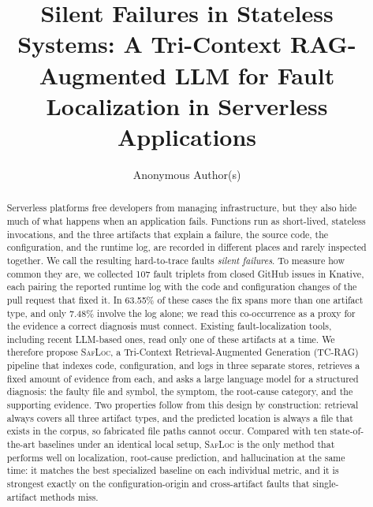 \documentclass[runningheads]{llncs}
\begin{document}
%
\title{Silent Failures in Stateless Systems: A Tri-Context RAG-Augmented LLM for Fault Localization in Serverless Applications}
%
%
\author{Anonymous Author(s)}
%
%
%
\maketitle              %
%
\begin{abstract}
Serverless platforms free developers from managing infrastructure, but they also hide much of what happens when an application fails. Functions run as short-lived, stateless invocations, and the three artifacts that explain a failure, the source code, the configuration, and the runtime log, are recorded in different places and rarely inspected together. We call the resulting hard-to-trace faults \emph{silent failures}. To measure how common they are, we collected 107 fault triplets from closed GitHub issues in Knative, each pairing the reported runtime log with the code and configuration changes of the pull request that fixed it. In 63.55\% of these cases the fix spans more than one artifact type, and only 7.48\% involve the log alone; we read this co-occurrence as a proxy for the evidence a correct diagnosis must connect. Existing fault-localization tools, including recent LLM-based ones, read only one of these artifacts at a time. We therefore propose \textsc{SafLoc}, a Tri-Context Retrieval-Augmented Generation (TC-RAG) pipeline that indexes code, configuration, and logs in three separate stores, retrieves a fixed amount of evidence from each, and asks a large language model for a structured diagnosis: the faulty file and symbol, the symptom, the root-cause category, and the supporting evidence. Two properties follow from this design by construction: retrieval always covers all three artifact types, and the predicted location is always a file that exists in the corpus, so fabricated file paths cannot occur. Compared with ten state-of-the-art baselines under an identical local setup, \textsc{SafLoc} is the only method that performs well on localization, root-cause prediction, and hallucination at the same time: it matches the best specialized baseline on each individual metric, and it is strongest exactly on the configuration-origin and cross-artifact faults that single-artifact methods miss.

\end{abstract}
\end{document}
